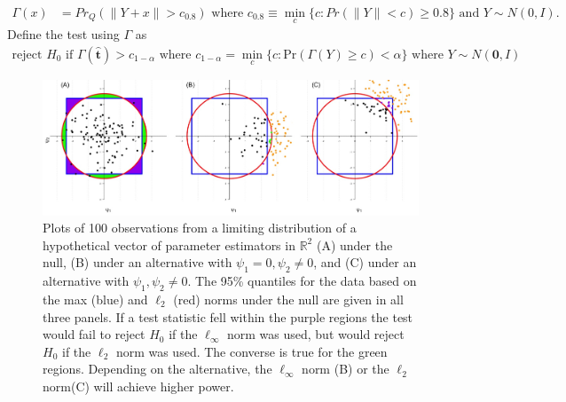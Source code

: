 \documentclass{article}
\newcommand{\tst}{\hat{\boldsymbol{t}}}
\newcommand{\rvt}{Y}
\newcommand{\rvv}{Z}
\newcommand{\distv}{Q}
\begin{document}
\begin{align}
	\Gamma(x) &= Pr_\distv(\|\rvt + x\| > c_{0.8})  \text{ where }  c_{0.8} \equiv \min_{c}\{c : Pr(\|\rvt\| < c) \geq 0.8 \} \text{ and } \rvt \sim N(0, I). \label{gamma:pow}
\end{align}
Define the test using $\Gamma$ as 
\begin{align*}
	\text{reject } H_0 \text{ if } \Gamma(\tst) > c_{1 - \alpha} \text { where } c_{1 - \alpha} = \min_{c}\{c : \text{Pr}(\Gamma(Y) \geq c) < \alpha\} \text{ where } Y \sim N(\boldsymbol{0}, I)
\end{align*}

\begin{figure}
	\centering
	\includegraphics[width = \linewidth]{figure_code/pwr_cmp.jpeg}
	\caption{Plots of 100 observations from a limiting distribution of a hypothetical vector of parameter estimators in $\mathbb{R}^2$ (A) under the null, (B) under an alternative with $\psi_1 = 0, \psi_2 \neq 0$, and (C) under an alternative with $\psi_1, \psi_2 \neq 0$. The 95\% quantiles for the data based on the max (blue) and $\ell_2$ (red) norms under the null are given in all three panels. If a test statistic fell within the purple regions the test would fail to reject $H_0$ if the $\ell_\infty$ norm was used, but would reject $H_0$ if the $\ell_2$ norm was used.  The converse is true for the green regions.  Depending on the alternative, the $\ell_\infty$ norm (B) or the $\ell_2$ norm(C) will achieve higher power.}
	\label{fig:figure1}
\end{figure}
\end{document}
